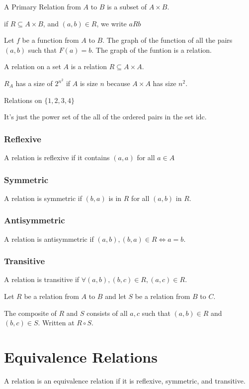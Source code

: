 \documentclass{report}
\begin{document}
A Primary Relation from $A$ to $B$ is a subset of $A \times B$.

if $R \subseteq A \times B$, and $(a, b) \in R$, we write $aRb$

Let $f$ be a function from $A$ to $B$. The graph of the function of all the pairs $(a, b)$ such that $F(a) = b$.
The graph of the funtion is a relation.

A relation on a set $A$ is a relation $R \subseteq A \times A$.

$R_A$ has a size of $2^{n^2}$ if $A$ is size $n$ because $A \times A$ has size $n^2$.

Relations on $\{1, 2, 3, 4\}$

It's just the power set of the all of the ordered pairs in the set idc.

\subsection{Reflexive}
A relation is reflexive if it contains $(a, a)$ for all $a \in A$

\subsection{Symmetric}
A relation is symmetric if $(b, a)$ is in $R$ for all $(a, b)$ in $R$.

\subsection{Antisymmetric}
A relation is antisymmetric if $(a, b), (b, a) \in R \iff a = b$.

\subsection{Transitive}
A relation is transitive if $\forall (a, b), (b, c) \in R, (a, c) \in R$.

Let $R$ be a relation from $A$ to $B$ and let $S$ be a relation from $B$ to $C$.

The composite of $R$ and $S$ consists of all $a, c$ such that $(a, b) \in R$ and $(b, c) \in S$.
Written at $R \circ S$.



\chapter{Equivalence Relations}
A relation is an equivalence relation if it is reflexive, symmetric, and transitive.
\end{document}
